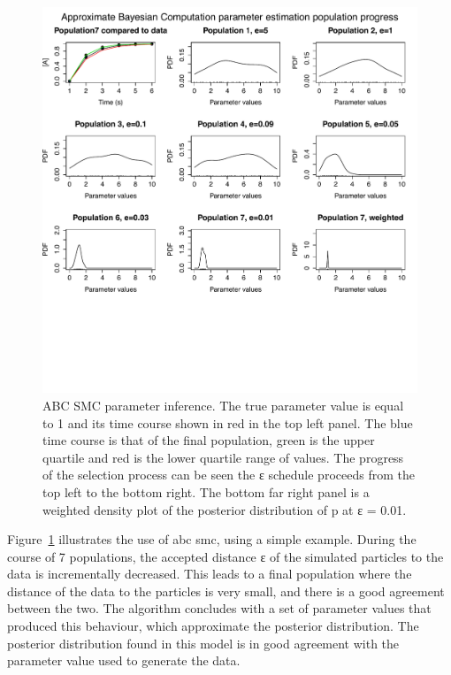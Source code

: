 \begin{figure}[htbp]
    \begin{center}
    \includegraphics[scale=0.6]{../../chapters/chapterIntroduction/images/abcsmc_ex.pdf}
    \caption[\acrshort{abc} \acrshort{smc} parameter inference example]{ABC SMC parameter inference. The true parameter value is equal to 1 and its time course shown in red in the top left panel. The blue time course is that of the final population, green is the upper quartile and red is the lower quartile range of values. The progress of the selection process can be seen the ε schedule proceeds from the top left to the bottom right. The bottom far right panel is a weighted density plot of the posterior distribution of p at ε = 0.01.  }
    \label{fig:myABC true 1}
    \end{center}
\end{figure}
\clearpage

Figure~\ref{fig:myABC true 1} illustrates the use of \acrshort{abc} \acrshort{smc}, using a simple example. During the course of 7 populations, the accepted distance ε of the simulated particles to the data is incrementally decreased. This leads to a final population where the distance of the data to the particles is very small, and there is a good agreement between the two. The algorithm concludes with a set of parameter values that produced this behaviour, which approximate the posterior distribution. The posterior distribution found in this model is in good agreement with the parameter value used to generate the data. 


